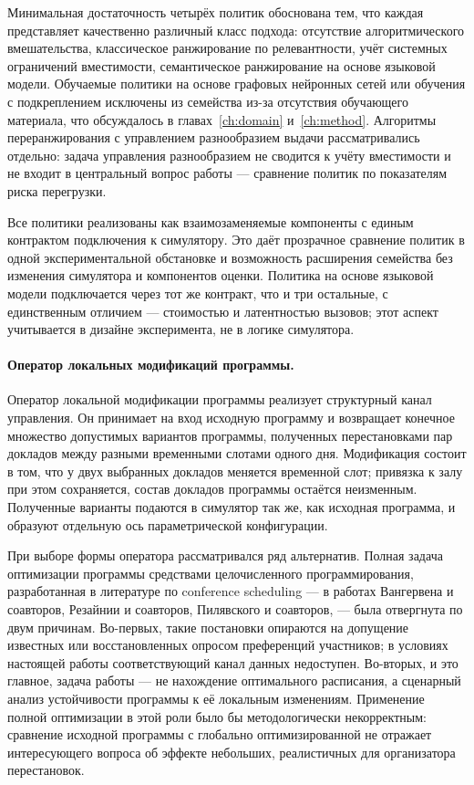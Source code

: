 Минимальная достаточность четырёх политик обоснована тем, что каждая представляет качественно различный класс подхода: отсутствие алгоритмического вмешательства, классическое ранжирование по релевантности, учёт системных ограничений вместимости, семантическое ранжирование на основе языковой модели. Обучаемые политики на основе графовых нейронных сетей или обучения с подкреплением исключены из семейства из-за отсутствия обучающего материала, что обсуждалось в главах~\ref{ch:domain} и~\ref{ch:method}. Алгоритмы переранжирования с управлением разнообразием выдачи рассматривались отдельно: задача управления разнообразием не сводится к учёту вместимости и не входит в центральный вопрос работы --- сравнение политик по показателям риска перегрузки.

Все политики реализованы как взаимозаменяемые компоненты с единым контрактом подключения к симулятору. Это даёт прозрачное сравнение политик в одной экспериментальной обстановке и возможность расширения семейства без изменения симулятора и компонентов оценки. Политика на основе языковой модели подключается через тот же контракт, что и три остальные, с единственным отличием --- стоимостью и латентностью вызовов; этот аспект учитывается в дизайне эксперимента, не в логике симулятора.

\paragraph{Оператор локальных модификаций программы.}
Оператор локальной модификации программы реализует структурный канал управления. Он принимает на вход исходную программу и возвращает конечное множество допустимых вариантов программы, полученных перестановками пар докладов между разными временными слотами одного дня. Модификация состоит в том, что у двух выбранных докладов меняется временной слот; привязка к залу при этом сохраняется, состав докладов программы остаётся неизменным. Полученные варианты подаются в симулятор так же, как исходная программа, и образуют отдельную ось параметрической конфигурации.

При выборе формы оператора рассматривался ряд альтернатив. Полная задача оптимизации программы средствами целочисленного программирования, разработанная в литературе по conference scheduling --- в работах Вангервена и соавторов, Резайнии и соавторов, Пилявского и соавторов, --- была отвергнута по двум причинам. Во-первых, такие постановки опираются на допущение известных или восстановленных опросом преференций участников; в условиях настоящей работы соответствующий канал данных недоступен. Во-вторых, и это главное, задача работы --- не нахождение оптимального расписания, а сценарный анализ устойчивости программы к её локальным изменениям. Применение полной оптимизации в этой роли было бы методологически некорректным: сравнение исходной программы с глобально оптимизированной не отражает интересующего вопроса об эффекте небольших, реалистичных для организатора перестановок.

